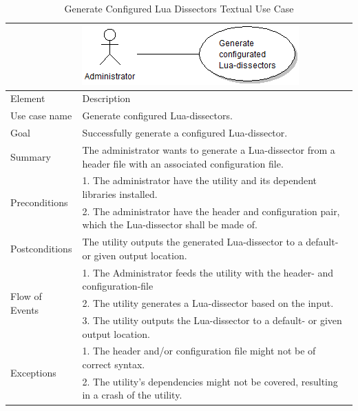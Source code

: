 \begin{table}[htbp] \footnotesize \center
\caption{Generate Configured Lua Dissectors Textual Use Case\label{tab:textual:generateconfiglua}}
\begin{tabularx}{\textwidth}{l X}
	 & \includegraphics[scale=0.8]{./planning/img/uc_generateconfiglua} \\
	\toprule
	Element & Description\\
	\midrule
	Use case name & Generate configured Lua-dissectors.\\
	Goal & Successfully generate a configured Lua-dissector. \\
	Summary & The administrator wants to generate a Lua-dissector from a header file with an associated configuration file. \\
	\multirow{2}{*}{Preconditions} & 1. The administrator have the utility and its dependent libraries installed.  \\
	& 2. The administrator have the header and configuration pair, which the Lua-dissector shall be made of. \\
	Postconditions & The utility outputs the generated Lua-dissector to a default- or given output location.\\
	\midrule
	\multirow{3}{*}{Flow of Events} & 1. The Administrator feeds the utility with the header- and configuration-file\\
	& 2. The utility generates a Lua-dissector based on the input. \\
	& 3. The utility outputs the Lua-dissector to a default- or given output location.\\
	\midrule
	\multirow{2}{*}{Exceptions} & 1. The header and/or configuration file might not be of correct syntax.\\
	& 2. The utility's dependencies might not be covered, resulting in a crash of the utility.\\
	\bottomrule
\end{tabularx}
\end{table}

